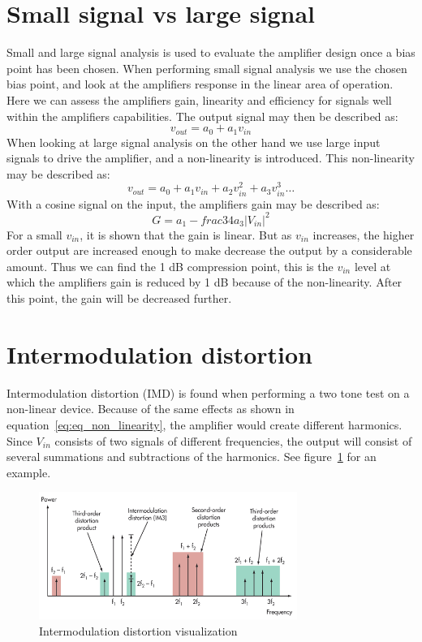 \section{Small signal vs large signal}
Small and large signal analysis is used to evaluate the amplifier design once a bias point has been chosen. When performing small signal analysis we use the chosen bias point, and look at the amplifiers response in the linear area of operation. Here we can assess the amplifiers gain, linearity and efficiency for signals well within the amplifiers capabilities. The output signal may then be described as:
\begin{equation}
v_{out}=a_0+a_1v_{in}
\end{equation}
When looking at large signal analysis on the other hand we use large input signals to drive the amplifier, and a non-linearity is introduced. This non-linearity may be described as:
\begin{equation}
v_{out}=a_0+a_1v_{in}+a_2v_{in}^2+a_3v_{in}^3 \dots
\label{eq:eq_non_linearity}
\end{equation}
With a cosine signal on the input, the amplifiers gain may be described as:
\begin{equation}
G=a_1-frac{3}{4}a_3|V_{in}|^2
\end{equation}
 For a small $v_{in}$, it is shown that the gain is linear. But as $v_{in}$ increases, the higher order output are increased enough to make decrease the output by a considerable amount. Thus we can find the 1 dB compression point, this is the $v_{in}$ level at which the amplifiers gain is reduced by 1 dB because of the non-linearity. After this point, the gain will be decreased further.

\section{Intermodulation distortion}
Intermodulation distortion (IMD) is found when performing a two tone test on a non-linear device. Because of the same effects as shown in equation~\ref{eq:eq_non_linearity}, the amplifier would create different harmonics. Since $V_{in}$ consists of two signals of different frequencies, the output will consist of several summations and subtractions of the harmonics. See figure~\ref{fig:fig_distortion_vis} for an example.

\begin{figure}[H]
	  \centering
	  \includegraphics[width=0.75\textwidth]{img/Intermodulation_distortion}
	  \caption{Intermodulation distortion visualization}
	  \label{fig:fig_distortion_vis}
\end{figure}